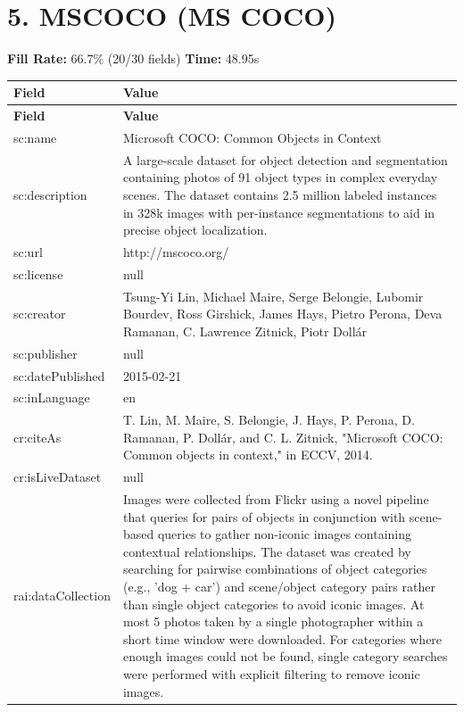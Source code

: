 \documentclass[10pt,a4paper]{article}
\begin{document}
\newpage

\section*{5. MSCOCO (MS COCO)}
\textbf{Fill Rate:} 66.7\% (20/30 fields) \quad \textbf{Time:} 48.95s

\begin{longtable}{|p{4cm}|p{12cm}|}
\hline
\textbf{Field} & \textbf{Value} \\
\hline
\endfirsthead
\hline
\textbf{Field} & \textbf{Value} \\
\hline
\endhead
\hline
\endfoot

sc:name & Microsoft COCO: Common Objects in Context \\
\hline
sc:description & A large-scale dataset for object detection and segmentation containing photos of 91 object types in complex everyday scenes. The dataset contains 2.5 million labeled instances in 328k images with per-instance segmentations to aid in precise object localization. \\
\hline
sc:url & http://mscoco.org/ \\
\hline
sc:license & null \\
\hline
sc:creator & Tsung-Yi Lin, Michael Maire, Serge Belongie, Lubomir Bourdev, Ross Girshick, James Hays, Pietro Perona, Deva Ramanan, C. Lawrence Zitnick, Piotr Doll\'{a}r \\
\hline
sc:publisher & null \\
\hline
sc:datePublished & 2015-02-21 \\
\hline
sc:inLanguage & en \\
\hline
cr:citeAs & T. Lin, M. Maire, S. Belongie, J. Hays, P. Perona, D. Ramanan, P. Doll\'{a}r, and C. L. Zitnick, "Microsoft COCO: Common objects in context," in ECCV, 2014. \\
\hline
cr:isLiveDataset & null \\
\hline
rai:dataCollection & Images were collected from Flickr using a novel pipeline that queries for pairs of objects in conjunction with scene-based queries to gather non-iconic images containing contextual relationships. The dataset was created by searching for pairwise combinations of object categories (e.g., 'dog + car') and scene/object category pairs rather than single object categories to avoid iconic images. At most 5 photos taken by a single photographer within a short time window were downloaded. For categories where enough images could not be found, single category searches were performed with explicit filtering to remove iconic images. \\

\end{longtable}
\end{document}
